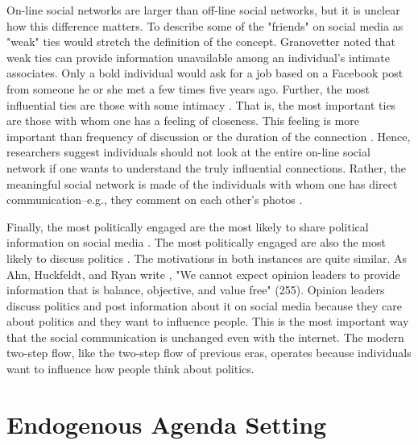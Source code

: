 \documentclass[12pt]{article}
\begin{document}
\begin{doublespace}
On-line social networks are larger than off-line social networks, but it is unclear how this difference matters. To describe some of the "friends" on social media as "weak" ties would stretch the definition of the concept. Granovetter \citeyearpar{Granovetter1973} noted that weak ties can provide information unavailable among an individual's intimate associates. Only a bold individual would ask for a job based on a Facebook post from someone he or she met a few times five years ago. Further, the most influential ties are those with some intimacy \citep{Kenny1998}. That is, the most important ties are those with whom one has a feeling of closeness. This feeling is more important than frequency of discussion or the duration of the connection \citep{MardsenCampbell1984}. Hence, researchers suggest individuals should not look at the entire on-line social network if one wants to understand the truly influential connections. Rather, the meaningful social network is made of the individuals with whom one has direct communication--e.g., they comment on each other's photos \citep{Jonesetal2013}.

Finally, the most politically engaged are the most likely to share political information on social media \citep{BekafigoMcBride2013}. The most politically engaged are also the most likely to discuss politics \citep{Huckfeldt2001}. The motivations in both instances are quite similar. As Ahn, Huckfeldt, and Ryan write \citeyearpar{AhnHuckfeldtRyan2014}, "We cannot expect opinion leaders to provide information that is balance, objective, and value free" (255). Opinion leaders discuss politics and post information about it on social media because they care about politics and they want to influence people. This is the most important way that the social communication is unchanged even with the internet. The modern two-step flow, like the two-step flow of previous eras, operates because individuals want to influence how people think about politics.


\section{Endogenous Agenda Setting}


\end{doublespace}
\end{document}

